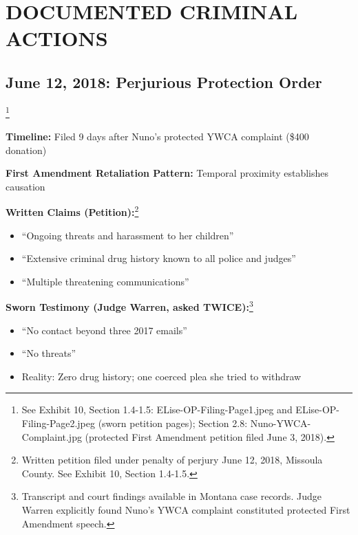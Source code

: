 \documentclass[12pt,oneside]{article}
\begin{document}
\section*{DOCUMENTED CRIMINAL ACTIONS}

\subsection*{June 12, 2018: Perjurious Protection Order}\footnote{See Exhibit 10, Section 1.4-1.5: ELise-OP-Filing-Page1.jpeg and ELise-OP-Filing-Page2.jpeg (sworn petition pages); Section 2.8: Nuno-YWCA-Complaint.jpg (protected First Amendment petition filed June 3, 2018).}

\textbf{Timeline:} Filed 9 days after Nuno's protected YWCA complaint (\$400 donation)

\textbf{First Amendment Retaliation Pattern:} Temporal proximity establishes causation

\textbf{Written Claims (Petition):}\footnote{Written petition filed under penalty of perjury June 12, 2018, Missoula County. See Exhibit 10, Section 1.4-1.5.}

\begin{itemize}

\item ``Ongoing threats and harassment to her children''

\item ``Extensive criminal drug history known to all police and judges''

\item ``Multiple threatening communications''

\end{itemize}

\textbf{Sworn Testimony (Judge Warren, asked TWICE):}\footnote{Transcript and court findings available in Montana case records. Judge Warren explicitly found Nuno's YWCA complaint constituted protected First Amendment speech.}

\begin{itemize}

\item ``No contact beyond three 2017 emails''

\item ``No threats''

\item Reality: Zero drug history; one coerced plea she tried to withdraw

\end{itemize}
\end{document}
